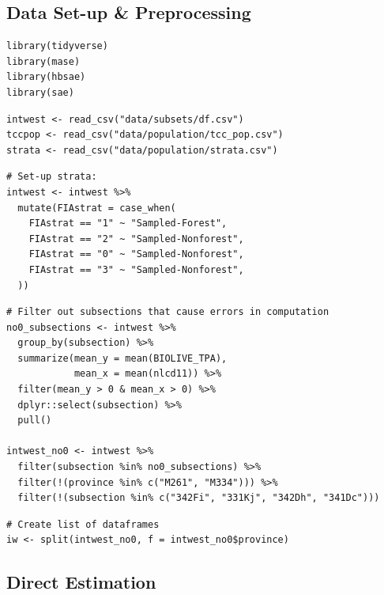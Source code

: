 \documentclass[12pt,twoside]{reedthesis}
\begin{document}
\hypertarget{data-set-up-preprocessing}{%
\subsection{Data Set-up \& Preprocessing}\label{data-set-up-preprocessing}}
\begin{verbatim}
library(tidyverse)
library(mase)
library(hbsae)
library(sae)
\end{verbatim}
\begin{verbatim}
intwest <- read_csv("data/subsets/df.csv")
tccpop <- read_csv("data/population/tcc_pop.csv")
strata <- read_csv("data/population/strata.csv")
\end{verbatim}
\begin{verbatim}
# Set-up strata:
intwest <- intwest %>%
  mutate(FIAstrat = case_when(
    FIAstrat == "1" ~ "Sampled-Forest",
    FIAstrat == "2" ~ "Sampled-Nonforest",
    FIAstrat == "0" ~ "Sampled-Nonforest",
    FIAstrat == "3" ~ "Sampled-Nonforest",
  )) 
\end{verbatim}
\begin{verbatim}
# Filter out subsections that cause errors in computation
no0_subsections <- intwest %>%
  group_by(subsection) %>%
  summarize(mean_y = mean(BIOLIVE_TPA),
            mean_x = mean(nlcd11)) %>%
  filter(mean_y > 0 & mean_x > 0) %>% 
  dplyr::select(subsection) %>%
  pull()

intwest_no0 <- intwest %>%
  filter(subsection %in% no0_subsections) %>%
  filter(!(province %in% c("M261", "M334"))) %>% 
  filter(!(subsection %in% c("342Fi", "331Kj", "342Dh", "341Dc"))) 
\end{verbatim}
\begin{verbatim}
# Create list of dataframes
iw <- split(intwest_no0, f = intwest_no0$province)
\end{verbatim}
\hypertarget{direct-estimation-1}{%
\subsection{Direct Estimation}\label{direct-estimation-1}}
\end{document}
